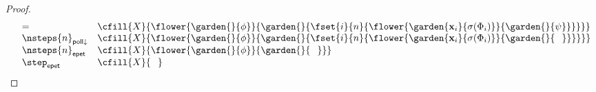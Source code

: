 \begin{proof}
$$\begin{array}{rll}
    &= &\cfill{X}{\flower{\garden{{}}{\phi}}{\garden{{}}{\fset{i}{n}{\flower{\garden{\mathbf{x}_i}{\sigma(\Phi_i)}}{\garden{{}}{\psi}}}}}} \\
    &\nsteps{n}_{\mathsf{poll}{\downarrow}} &\cfill{X}{\flower{\garden{{}}{\phi}}{\garden{{}}{\fset{i}{n}{\flower{\garden{\mathbf{x}_i}{\sigma(\Phi_i)}}{\garden{{}}{\phantom{\Phi}}}}}}} \\
    &\nsteps{n}_{\mathsf{epet}} &\cfill{X}{\flower{\garden{{}}{\phi}}{\garden{{}}{\phantom{\Phi}}}} \\
    &\step_{\mathsf{epet}} &\cfill{X}{\phantom{\Phi}}
  \end{array}
  $$
\end{proof}

